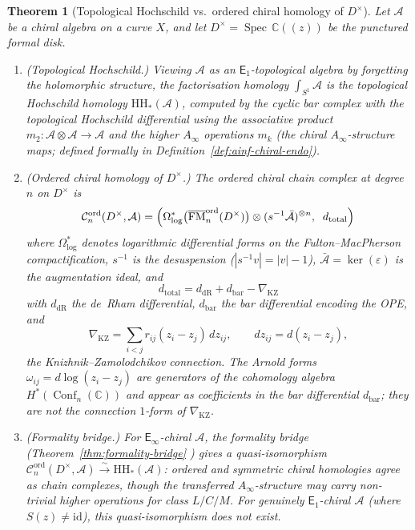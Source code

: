 \documentclass[11pt,reqno]{amsart}
\newtheorem{theorem}{Theorem}[section]
\theoremstyle{definition}
\theoremstyle{remark}
\newcommand{\cA}{\mathcal{A}}
\newcommand{\cC}{\mathcal{C}}
\newcommand{\HH}{\mathrm{HH}}
\newcommand{\Ainf}{A_{\infty}}
\newcommand{\Eone}{\mathsf{E}_{1}}
\newcommand{\Einf}{\mathsf{E}_{\infty}}
\DeclareMathOperator{\Conf}{Conf}
\DeclareMathOperator{\FM}{FM}
\DeclareMathOperator{\Spec}{Spec}
\newcommand{\CC}{\mathbb{C}}
\newcommand{\id}{\mathrm{id}}
\numberwithin{equation}{section}
\begin{document}
\begin{theorem}[Topological Hochschild vs.\ ordered
chiral homology of $D^\times$]\label{thm:hh-vs-ch}
Let $\cA$ be a chiral algebra on a curve $X$, and let
$D^\times = \Spec\, \CC((z))$ be the punctured formal disk.
\begin{enumerate}[label=\textup{(\roman*)}]
\item \textup{(Topological Hochschild.)}
  Viewing $\cA$ as an $\Eone$-topological algebra by
  forgetting the holomorphic structure, the factorisation
  homology $\int_{S^1} \cA$ is the topological Hochschild homology
  $\HH_*(\cA)$, computed by the cyclic bar complex with the
  topological Hochschild differential using the associative product
  $m_2 \colon \cA \otimes \cA \to \cA$ and the higher
  $\Ainf$ operations $m_k$ (the chiral $\Ainf$-structure
  maps; defined formally in
  Definition~\ref{def:ainf-chiral-endo}).
\item \textup{(Ordered chiral homology of $D^\times$.)}
  The ordered chiral chain complex at degree~$n$ on $D^\times$ is
  \begin{equation}\label{eq:ch-cx-Dx}
    \cC_n^{\mathrm{ord}}(D^\times, \cA)
    = \Bigl(
    \Omega^*_{\log}\bigl(
    \overline{\FM}_n^{\mathrm{ord}}(D^\times)\bigr)
    \otimes (s^{-1}\bar{\cA})^{\otimes n},
    \;\; d_{\mathrm{total}}
    \Bigr)
  \end{equation}
  where $\Omega^*_{\log}$ denotes logarithmic differential
  forms on the Fulton--MacPherson compactification,
  $s^{-1}$ is the desuspension
  \textup{(}$|s^{-1}v| = |v| - 1$\textup{)},
  $\bar{\cA} = \ker(\varepsilon)$ is the augmentation ideal,
  and
  \begin{equation}\label{eq:d-total}
    d_{\mathrm{total}}
    = d_{\mathrm{dR}}
    + d_{\mathrm{bar}}
    - \nabla_{\mathrm{KZ}}
  \end{equation}
  with $d_{\mathrm{dR}}$ the de~Rham differential,
  $d_{\mathrm{bar}}$ the bar differential encoding the OPE, and
  \begin{equation}\label{eq:kz}
    \nabla_{\mathrm{KZ}}
    = \sum_{i < j} r_{ij}(z_i - z_j) \, dz_{ij},
    \qquad
    dz_{ij} = d(z_i - z_j),
  \end{equation}
  the Knizhnik--Zamolodchikov connection.
  The Arnold forms
  $\omega_{ij} = d\log(z_i - z_j)$ are generators of the
  cohomology algebra $H^*(\Conf_n(\CC))$ and appear as
  coefficients in the bar differential $d_{\mathrm{bar}}$;
  they are \emph{not} the connection $1$-form of $\nabla_{\mathrm{KZ}}$.
\item \textup{(Formality bridge.)} For $\Einf$-chiral $\cA$,
  the formality bridge
  \textup{(}Theorem~\textup{\ref{thm:formality-bridge}}%
  \textup{)} gives a quasi-isomorphism
  $\cC_n^{\mathrm{ord}}(D^\times, \cA)
  \xrightarrow{\sim} \HH_*(\cA)$:
  ordered and symmetric chiral homologies agree as chain
  complexes, though the transferred $\Ainf$-structure may
  carry non-trivial higher operations for class $L/C/M$.
  For genuinely $\Eone$-chiral $\cA$ \textup{(}where
  $S(z) \neq \id$\textup{)}, this quasi-isomorphism does
  not exist.
\end{enumerate}
\end{theorem}
\end{document}
